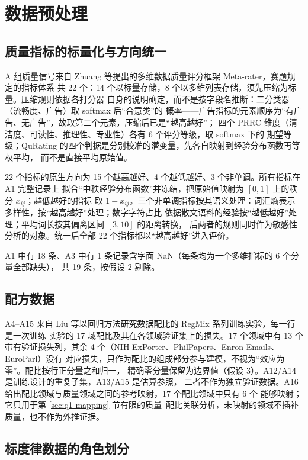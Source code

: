 \section{数据预处理}

\subsection{质量指标的标量化与方向统一}

A 组质量信号来自 Zhuang 等提出的多维数据质量评分框架 Meta-rater\cite{zhuang2025metarater}，赛题规定的指标体系
共 22 个：14 个以标量存储，8 个以多维列表存储，须先压缩为标量。压缩规则依据各打分器
自身的说明确定，而不是按字段名推断：二分类器（流畅度、广告）取 softmax 后“合意类”的
概率——广告指标的元素顺序为“有广告、无广告”，故取第二个元素，压缩后已是“越高越好”；
四个 PRRC 维度（清洁度、可读性、推理性、专业性）各有 6 个评分等级，取 softmax 下的
期望等级；QuRating 的四个判据是分别校准的潜变量，先各自映射到经验分布函数再等权平均，
而不是直接平均原始值。

22 个指标的原生方向为 15 个越高越好、4 个越低越好、3 个非单调。所有指标在 A1 完整记录上
拟合“中秩经验分布函数”并冻结，把原始值映射为 $[0,1]$ 上的秩分 $x_{ij}$；越低越好的指标
取 $1-x_{ij}$。三个非单调指标按其语义处理：词汇熵表示多样性，按“越高越好”处理；数字字符占比
依据散文语料的经验按“越低越好”处理；平均词长按其偏离区间 $[3,10]$ 的距离转换\cite{rae2021gopher}，
后两者的规则同时作为敏感性分析的对象。统一后全部 22 个指标都以“越高越好”进入评价。

A1 中有 18 条、A3 中有 1 条记录含字面 NaN（每条均为一个多维指标的 6 个分量全部缺失），
共 19 条，按假设 2 剔除。

\subsection{配方数据}

A4--A15 来自 Liu 等以回归方法研究数据配比的 RegMix 系列训练实验\cite{liu2025regmix}，每一行是一次训练
实验的 17 域配比及其在各领域验证集上的损失。17 个领域中有
13 个带有验证损失列，其余 4 个（NIH ExPorter、PhilPapers、Enron Emails、EuroParl）没有
对应损失，只作为配比的组成部分参与建模，不视为“效应为零”。配比按行正分量之和归一，
精确零分量保留为边界值（假设 3）。A12/A14 是训练设计的重复子集，A13/A15 是估算参照，
二者不作为独立验证数据。A16 给出配比领域与质量领域之间的参考映射，17 个配比领域中只有 6 个
能够映射；它只用于第 \ref{sec:q1-mapping} 节有限的质量–配比关联分析，未映射的领域不插补质量，也不作为外推证据。

\subsection{标度律数据的角色划分}

